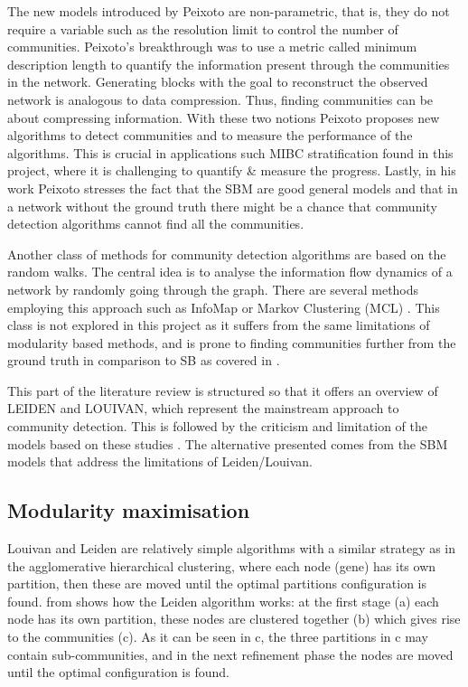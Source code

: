 The new models introduced by Peixoto are non-parametric, that is, they do not require a variable such as the resolution limit to control the number of communities. Peixoto's breakthrough was to use a metric called minimum description length to quantify the information present through the communities in the network. Generating blocks with the goal to reconstruct the observed network is analogous to data compression. Thus, finding communities can be about compressing information. With these two notions Peixoto proposes new algorithms to detect communities and to measure the performance of the algorithms. This is crucial in applications such MIBC stratification found in this project, where it is challenging to quantify \& measure the progress. Lastly, in his work Peixoto stresses the fact that the SBM are good general models and that in a network without the ground truth there might be a chance that community detection algorithms cannot find all the communities.

Another class of methods for community detection algorithms are based on the random walks. The central idea is to analyse the information flow dynamics of a network by randomly going through the graph. There are several methods employing this approach such as InfoMap  \citep{Rosvall2008-kw} or Markov Clustering (MCL) \citep{Van_Dongen2008-yj}. This class is not explored in this project as it suffers from the same limitations of modularity based methods, and is prone to finding communities further from the ground truth in comparison to SB as covered in \cite{Peixoto2021-jx}.

This part of the literature review is structured so that it offers an overview of \gls{LEIDEN} and \gls{LOUIVAN}, which represent the mainstream approach to community detection. This is followed by the criticism and limitation of the models based on these studies \citep{Peixoto2021-jx, Peixoto2023-rt, Shemirani2023-ww}. The alternative presented comes from the SBM models that address the limitations of Leiden/Louivan.


\subsection{Modularity maximisation} \label{s:lit:mod_max}

Louivan \citep{Blondel2008-ik} and Leiden \citep{Traag2019-ne} are relatively simple algorithms with a similar strategy as in the agglomerative hierarchical clustering, where each node (gene) has its own partition, then these are moved until the optimal partitions configuration is found.  from \cite{Traag2019-ne} shows how the Leiden algorithm works: at the first stage (a) each node has its own partition, these nodes are clustered together (b) which gives rise to the communities (c). As it can be seen in c, the three partitions in c may contain sub-communities, and in the next refinement phase the nodes are moved until the optimal configuration is found.

